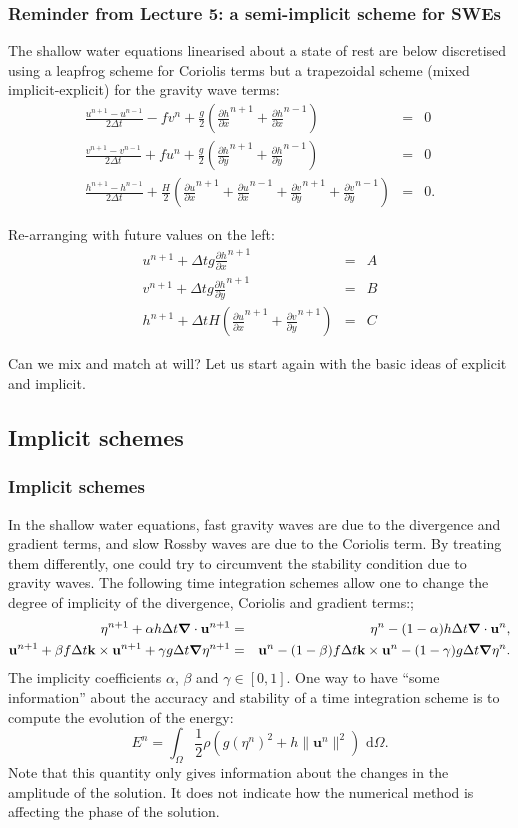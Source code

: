 \documentclass[xcolor=dvipsnames]{beamer} %
\newcommand{\BSS}{ \begin{scriptsize}}
\newcommand{\ESS}{ \end{scriptsize}}
\newcommand{\bnabla}{\mbox{\boldmath $\nabla$}}
\newcommand{\ud}{\textrm{ d}}
\newcommand{\bu}{\mathbf{u}}
\newcommand{\bk}{\mathbf{k}}
\newcommand{\partd}[2]{\frac{\partial #1}{\partial #2}}
\begin{document}
\frame
{
	\frametitle{Reminder from Lecture 5: a semi-implicit scheme for SWEs}
	\BSS
	
	The shallow water equations linearised about a state of rest are below
	discretised using a leapfrog scheme for Coriolis terms but a
	trapezoidal scheme (mixed implicit-explicit) for the gravity wave
	terms:
	\begin{eqnarray*}
		\frac{u^{n+1}-u^{n-1}}{2\Delta t}-fv^n+\frac{g}{2}
		\left( \partd{h}{x}^{n+1} +\partd{h}{x}^{n-1} \right) & = & 0 \\
		\frac{v^{n+1}-v^{n-1}}{2\Delta t}+fu^n+\frac{g}{2}
		\left( \partd{h}{y}^{n+1} +\partd{h}{y}^{n-1} \right) & = & 0 \\
		\frac{h^{n+1}-h^{n-1}}{2\Delta t}+\frac{H}{2}
		\left( \partd{u}{x}^{n+1} +\partd{u}{x}^{n-1}
		+\partd{v}{y}^{n+1} +\partd{v}{y}^{n-1} 
		\right) & = & 0. 
	\end{eqnarray*}
	
	Re-arranging with future values on the left:
	\begin{eqnarray*}
		u^{n+1}+\Delta t g \partd{h}{x}^{n+1} & = & A \\
		v^{n+1}+\Delta t g \partd{h}{y}^{n+1} & = & B \\
		h^{n+1}+\Delta t H \left( \partd{u}{x}^{n+1}+\partd{v}{y}^{n+1} \right) & = & C
	\end{eqnarray*}
	
	Can we mix and match at will? Let us start again with the basic ideas of explicit and implicit.
	
	\ESS
}

\subsection{Implicit schemes}
\frame
{
	\frametitle{Implicit schemes}
	\BSS
	In the shallow water equations, fast gravity waves are due to the divergence and gradient terms, and slow Rossby waves are due to the Coriolis term. By treating them differently, one could try to circumvent the stability condition due to gravity waves. The following time integration schemes allow one to change the degree of implicity of the divergence, Coriolis and gradient terms:;
	\begin{eqnarray*}
		\eta^{n+1} + \alpha h \Delta t \bnabla \cdot \bu^{n+1} &=& \eta^n - (1-\alpha) h \Delta t \bnabla \cdot \bu^n,
		\\
		\bu^{n+1} + \beta f \Delta t \bk \times \bu^{n+1} + \gamma g \Delta t \bnabla \eta^{n+1} &=& \bu^n - (1-\beta) f \Delta t \bk \times \bu^n - (1-\gamma) g \Delta t \bnabla \eta^n.
	\end{eqnarray*}
	The implicity coefficients $\alpha$, $\beta$ and $\gamma \in [0,1]$. One way to have ``some information'' about the accuracy and stability of a time integration scheme is to compute the evolution of the energy:
	\[
	E^n = \int_{\Omega} \frac{1}{2} \rho \left( g (\eta^n)^2 + h \|\bu^n\|^2 \right) \ud \Omega.
	\]
	Note that this quantity only gives information about the changes in the amplitude of the solution. It does not indicate how the numerical method is affecting the phase of the solution.
	\ESS
}
\end{document}
